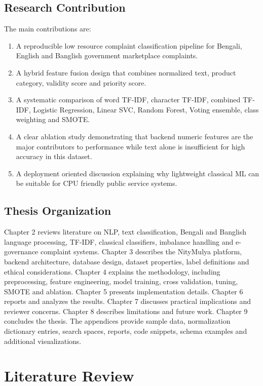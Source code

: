 \documentclass[12pt,a4paper,openany]{book}
\begin{document}
\section{Research Contribution}
The main contributions are:
\begin{enumerate}
  \item A reproducible low resource complaint classification pipeline for Bengali, English and Banglish government marketplace complaints.
  \item A hybrid feature fusion design that combines normalized text, product category, validity score and priority score.
  \item A systematic comparison of word TF-IDF, character TF-IDF, combined TF-IDF, Logistic Regression, Linear SVC, Random Forest, Voting ensemble, class weighting and SMOTE.
  \item A clear ablation study demonstrating that backend numeric features are the major contributors to performance while text alone is insufficient for high accuracy in this dataset.
  \item A deployment oriented discussion explaining why lightweight classical ML can be suitable for CPU friendly public service systems.
\end{enumerate}

\section{Thesis Organization}
Chapter 2 reviews literature on NLP, text classification, Bengali and Banglish language processing, TF-IDF, classical classifiers, imbalance handling and e-governance complaint systems. Chapter 3 describes the NityMulya platform, backend architecture, database design, dataset properties, label definitions and ethical considerations. Chapter 4 explains the methodology, including preprocessing, feature engineering, model training, cross validation, tuning, SMOTE and ablation. Chapter 5 presents implementation details. Chapter 6 reports and analyzes the results. Chapter 7 discusses practical implications and reviewer concerns. Chapter 8 describes limitations and future work. Chapter 9 concludes the thesis. The appendices provide sample data, normalization dictionary entries, search spaces, reports, code snippets, schema examples and additional visualizations.

\chapter{Literature Review}
\end{document}
